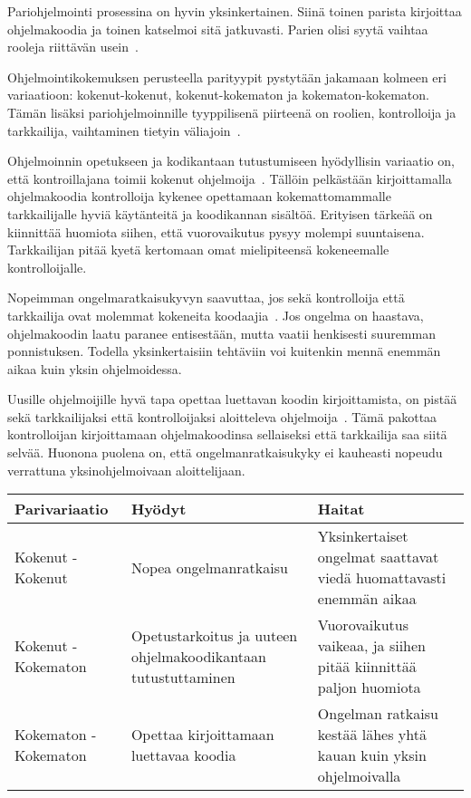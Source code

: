 \documentclass[finnish]{tktltiki2}
\theoremstyle{definition}
\theoremstyle{remark}
\begin{document}
Pariohjelmointi prosessina on hyvin yksinkertainen. Siinä toinen parista kirjoittaa ohjelmakoodia ja toinen katselmoi sitä jatkuvasti. Parien olisi syytä vaihtaa rooleja riittävän usein~\cite{beck00extreme}. 

Ohjelmointikokemuksen perusteella parityypit pystytään jakamaan kolmeen eri variaatioon: kokenut-kokenut, kokenut-kokematon ja kokematon-kokematon. Tämän lisäksi pariohjelmoinnille tyyppilisenä piirteenä on roolien, kontrolloija ja tarkkailija, vaihtaminen tietyin väliajoin~\cite{williams02support}.

Ohjelmoinnin opetukseen ja kodikantaan tutustumiseen hyödyllisin variaatio on, että kontroillajana toimii kokenut ohjelmoija~\cite{chong2007social}. Tällöin pelkästään kirjoittamalla ohjelmakoodia kontrolloija kykenee opettamaan kokemattomammalle tarkkailijalle hyviä käytänteitä ja koodikannan sisältöä. Erityisen tärkeää on kiinnittää huomiota siihen, että vuorovaikutus pysyy molempi suuntaisena. Tarkkailijan pitää kyetä kertomaan omat mielipiteensä kokeneemalle kontrolloijalle.

Nopeimman ongelmaratkaisukyvyn saavuttaa, jos sekä kontrolloija että tarkkailija ovat molemmat kokeneita koodaajia~\cite{voas2001faster}. Jos ongelma on haastava, ohjelmakoodin laatu paranee entisestään,  mutta vaatii henkisesti suuremman ponnistuksen. Todella yksinkertaisiin tehtäviin voi kuitenkin mennä enemmän aikaa kuin yksin ohjelmoidessa.

Uusille ohjelmoijille hyvä tapa opettaa luettavan koodin kirjoittamista, on pistää sekä tarkkailijaksi että kontrolloijaksi aloitteleva ohjelmoija~\cite{chong2007social}. Tämä pakottaa kontrolloijan kirjoittamaan ohjelmakoodinsa sellaiseksi että tarkkailija saa siitä selvää. Huonona puolena on, että ongelmanratkaisukyky ei kauheasti nopeudu verrattuna yksinohjelmoivaan aloittelijaan.

\begin{center}
    \begin{tabular}{ | p{} | p{5cm} | p{4cm} | }
    \hline
   	Parivariaatio & Hyödyt & Haitat \\ \hline
    	Kokenut - Kokenut & Nopea ongelmanratkaisu & Yksinkertaiset ongelmat saattavat viedä huomattavasti enemmän aikaa\\ \hline
	Kokenut - Kokematon & Opetustarkoitus ja uuteen ohjelmakoodikantaan tutustuttaminen & Vuorovaikutus vaikeaa, ja siihen pitää kiinnittää paljon huomiota\\ \hline
	Kokematon - Kokematon & Opettaa kirjoittamaan luettavaa koodia & Ongelman ratkaisu kestää lähes yhtä kauan kuin yksin ohjelmoivalla \\ \hline
    \end{tabular}
\end{center}
\end{document}

